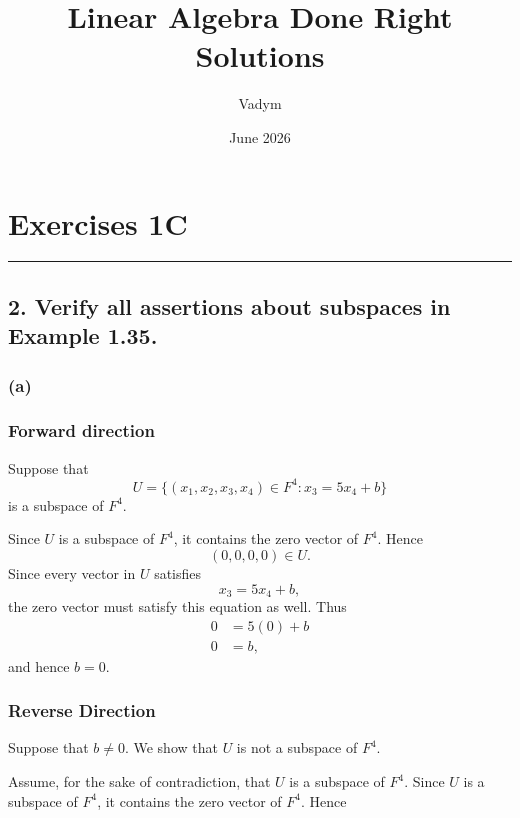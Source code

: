 \documentclass{article}
\title{Linear Algebra Done Right Solutions}
\author{Vadym}
\date{June 2026}
\begin{document}
\maketitle
\thispagestyle{empty}
\clearpage
\setcounter{page}{1}

\section*{Exercises 1C}
{\color{red}\rule{\textwidth}{0.5pt}}

\subsection*{2. Verify all assertions about subspaces in Example 1.35.}

\subsubsection*{(a)}

\noindent{}

\subsubsection*{}
\subsubsection*{Forward direction}
\noindent
Suppose that
\[
U=\{(x_1,x_2,x_3,x_4)\in F^4 : x_3=5x_4+b\}
\]
is a subspace of $F^4$.

Since $U$ is a subspace of $F^4$, it contains the zero vector of $F^4$. Hence
\[
(0,0,0,0)\in U.
\]
Since every vector in $U$ satisfies
\[
x_3 = 5x_4 + b,
\]
the zero vector must satisfy this equation as well. Thus
\[
\begin{aligned}
0 &= 5(0) + b\\
0 &= b,
\end{aligned}
\]
and hence $b=0$.

\subsubsection*{Reverse Direction}

\noindent
Suppose that $b \neq 0$. We show that $U$ is not a subspace of $F^4$.

Assume, for the sake of contradiction, that $U$ is a subspace of $F^4$. Since $U$ is a subspace of $F^4$, it contains the zero vector of $F^4$. Hence
\end{document}
